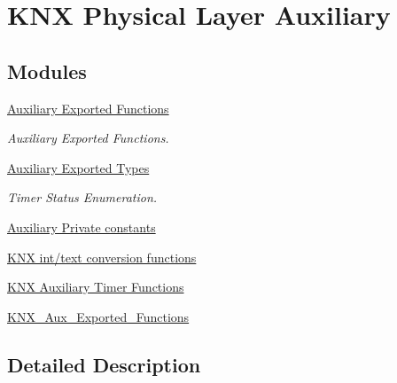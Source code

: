 \hypertarget{group___k_n_x___aux}{}\section{K\+NX Physical Layer Auxiliary}
\label{group___k_n_x___aux}
\subsection*{Modules}
\begin{DoxyCompactItemize}
\item 
\hyperlink{group___k_n_x___aux___exported___consts}{Auxiliary Exported Functions}
\begin{DoxyCompactList}\small\item\em Auxiliary Exported Functions. \end{DoxyCompactList}\item 
\hyperlink{group___k_n_x___aux___exported___types}{Auxiliary Exported Types}
\begin{DoxyCompactList}\small\item\em Timer Status Enumeration. \end{DoxyCompactList}\item 
\hyperlink{group___k_n_x___aux___private___consts}{Auxiliary Private constants}
\item 
\hyperlink{group___k_n_x___aux___exported___functions___group1}{K\+N\+X int/text conversion functions}
\item 
\hyperlink{group___k_n_x___aux___exported___functions___group2}{K\+N\+X Auxiliary Timer Functions}
\item 
\hyperlink{group___k_n_x___aux___exported___functions}{K\+N\+X\+\_\+\+Aux\+\_\+\+Exported\+\_\+\+Functions}
\end{DoxyCompactItemize}


\subsection{Detailed Description}
